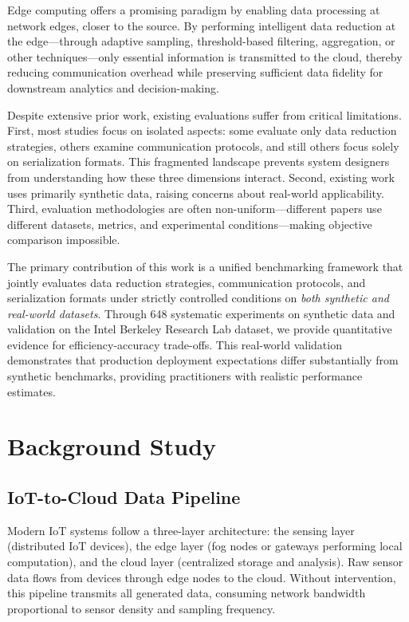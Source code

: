 \documentclass[10pt,twocolumn]{article}
\begin{document}
Edge computing offers a promising paradigm by enabling data processing at network edges, closer to the source. By performing intelligent data reduction at the edge---through adaptive sampling, threshold-based filtering, aggregation, or other techniques---only essential information is transmitted to the cloud, thereby reducing communication overhead while preserving sufficient data fidelity for downstream analytics and decision-making.

Despite extensive prior work, existing evaluations suffer from critical limitations. First, most studies focus on isolated aspects: some evaluate only data reduction strategies, others examine communication protocols, and still others focus solely on serialization formats. This fragmented landscape prevents system designers from understanding how these three dimensions interact. Second, existing work uses primarily synthetic data, raising concerns about real-world applicability. Third, evaluation methodologies are often non-uniform---different papers use different datasets, metrics, and experimental conditions---making objective comparison impossible.

The primary contribution of this work is a unified benchmarking framework that jointly evaluates data reduction strategies, communication protocols, and serialization formats under strictly controlled conditions on \textit{both synthetic and real-world datasets}. Through 648 systematic experiments on synthetic data and validation on the Intel Berkeley Research Lab dataset, we provide quantitative evidence for efficiency-accuracy trade-offs. This real-world validation demonstrates that production deployment expectations differ substantially from synthetic benchmarks, providing practitioners with realistic performance estimates.

\section{Background Study}

\subsection{IoT-to-Cloud Data Pipeline}

Modern IoT systems follow a three-layer architecture: the sensing layer (distributed IoT devices), the edge layer (fog nodes or gateways performing local computation), and the cloud layer (centralized storage and analysis). Raw sensor data flows from devices through edge nodes to the cloud. Without intervention, this pipeline transmits all generated data, consuming network bandwidth proportional to sensor density and sampling frequency.
\end{document}
